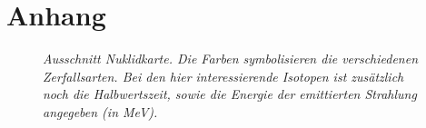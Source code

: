\documentclass[landscape,twocolumn]{article}
\begin{document}
\section{Anhang}
\begin{figure}[h]
\begin{minipage}[c]{12cm}
\centering{}
\caption{\label{252_nuklidkarte}\fontsize{10}{12}\it Ausschnitt Nuklidkarte. Die Farben symbolisieren die verschiedenen Zerfallsarten. Bei den hier interessierende Isotopen ist zus\"{a}tzlich noch die Halbwertszeit, sowie die Energie der emittierten Strahlung angegeben (in MeV).}
\end{minipage}
\end{figure}


 \setcounter{section}{0}

\setcounter{figure}{0}

\setcounter{equation}{0}

\setcounter{footnote}{0}

 \setcounter{section}{0}
\end{document}
